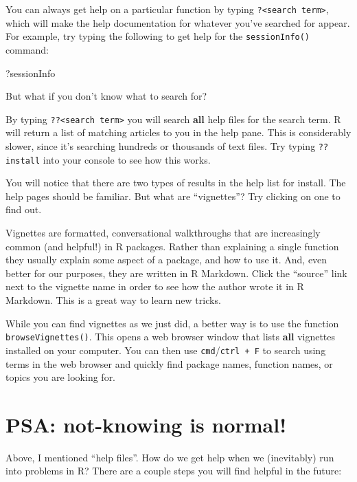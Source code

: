 \documentclass[
]{book}
\newenvironment{Shaded}{\begin{snugshade}}{\end{snugshade}}
\newcommand{\NormalTok}[1]{#1}
\begin{document}
You can always get help on a particular function by typing \texttt{?\textless{}search\ term\textgreater{}}, which will make the help documentation for whatever you've searched for appear. For example, try typing the following to get help for the \texttt{sessionInfo()} command:

\begin{Shaded}
\begin{Highlighting}[]
\NormalTok{?sessionInfo}
\end{Highlighting}
\end{Shaded}

But what if you don't know what to search for?

By typing \texttt{??\textless{}search\ term\textgreater{}} you will search \textbf{all} help files for the search term. R will return a list of matching articles to you in the help pane. This is considerably slower, since it's searching hundreds or thousands of text files. Try typing \texttt{??install} into your console to see how this works.

You will notice that there are two types of results in the help list for install. The help pages should be familiar. But what are ``vignettes''? Try clicking on one to find out.

Vignettes are formatted, conversational walkthroughs that are increasingly common (and helpful!) in R packages. Rather than explaining a single function they usually explain some aspect of a package, and how to use it. And, even better for our purposes, they are written in R Markdown. Click the ``source'' link next to the vignette name in order to see how the author wrote it in R Markdown. This is a great way to learn new tricks.

While you can find vignettes as we just did, a better way is to use the function \texttt{browseVignettes()}. This opens a web browser window that lists \textbf{all} vignettes installed on your computer. You can then use \texttt{cmd}/\texttt{ctrl\ +\ F} to search using terms in the web browser and quickly find package names, function names, or topics you are looking for.

\hypertarget{psa-not-knowing-is-normal}{%
\section*{PSA: not-knowing is normal!}\label{psa-not-knowing-is-normal}}

Above, I mentioned ``help files''. How do we get help when we (inevitably) run into problems in R? There are a couple steps you will find helpful in the future:
\end{document}
